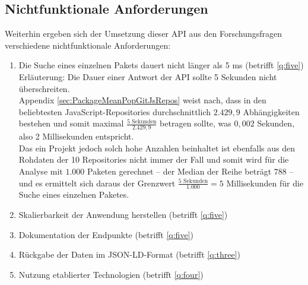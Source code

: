 \subsection{Nichtfunktionale Anforderungen} \label{sec:N_Anforderungen}
    Weiterhin ergeben sich der Umsetzung dieser \ac{API} aus den Forschungsfragen verschiedene nichtfunktionale Anforderungen:
    \begin{enumerate}[label=\textbf{NFRQ-\Roman*}, leftmargin=2.5cm]
        \item Die Suche eines einzelnen Pakets dauert nicht länger als 5 ms (betrifft \ref{q:five}) \label{nf:one}
        \\
        Erläuterung:
        Die Dauer einer Antwort der API sollte 5 Sekunden nicht überschreiten.\textsuperscript{\cite{link:ApiResponseTime}}
        \\
        Appendix \ref{sec:PackageMeanPopGitJsRepos} weist nach, dass in den beliebtesten JavaScript-Repositories durchschnittlich $2.429,9$ Abhängigkeiten bestehen und somit maximal $\frac{5\text{ Sekunden}}{2.429,9}$ betragen sollte, was $0,002$ Sekunden, also 2 Millisekunden entspricht.
        \\
        Das ein Projekt jedoch solch hohe Anzahlen beinhaltet ist ebenfalls aus den Rohdaten der 10 Repositories nicht immer der Fall und somit wird für die Analyse mit $1.000$ Paketen gerechnet -- der Median der Reihe beträgt $788$ -- und es ermittelt sich daraus der Grenzwert $\frac{5\text{ Sekunden}}{1.000} = 5$ Millisekunden für die Suche eines einzelnen Paketes.
        \item Skalierbarkeit der Anwendung herstellen (betrifft \ref{q:five}) \label{nf:two}
        \item Dokumentation der Endpunkte (betrifft \ref{q:five}) \label{nf:three}
        \item Rückgabe der Daten im \acs{JSON-LD}-Format (betrifft \ref{q:three}) \label{nf:four}
        \item Nutzung etablierter Technologien (betrifft \ref{q:four}) \label{nf:five}
    \end{enumerate}